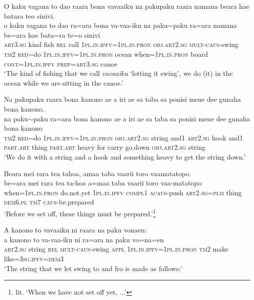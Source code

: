 \ea\label{ex:text26-1}
O kaku vagana to dao raara bona vavaaiku na pakupaku raara namana beara hae batara teo sinivi.\\
\gll o	kaku	vagana	to	dao	ra=ara	bona	va-vaa-iku	na	paku{$\sim$}paku	ra=ara	namana	be=ara	hae	bata=ra	te=o	sinivi\\
     \textsc{art}3.\textsc{sg}	kind	fish	\textsc{rel}	call	1\textsc{pl}.\textsc{in}.\textsc{ipfv}=1\textsc{pl}.\textsc{in}.\textsc{pron}	\textsc{obj}.\textsc{art}2.\textsc{sg}	\textsc{mult}-\textsc{caus}-swing	\textsc{tm}2	\textsc{red}{$\sim$}do	1\textsc{pl}.\textsc{in}.\textsc{ipfv}=1\textsc{pl}.\textsc{in}.\textsc{pron}	ocean	when=1\textsc{pl}.\textsc{in}.\textsc{pron}	board	\textsc{cont}=1\textsc{pl}.\textsc{in}.\textsc{ipfv}	\textsc{prep}=\textsc{art}3.\textsc{sg}	canoe\\
\glt `The kind of fishing that we call \textit{vavaaiku} `letting it swing', we do (it) in the ocean while we are sitting in the canoe.'
\z

\ea\label{ex:text26-2}
Na pakupaku raara bona kanono ae a iri ae sa taba sa ponisi mene dee gunaha bona kanono.\\
\gll na	paku{$\sim$}paku	ra=ara	bona	kanono	ae	a	iri	ae	sa	taba	sa	ponisi	mene	dee	gunaha	bona	kanono\\
     \textsc{tm}2	\textsc{red}{$\sim$}do	1\textsc{pl}.\textsc{in}.\textsc{ipfv}=1\textsc{pl}.\textsc{in}.\textsc{pron}	\textsc{obj}.\textsc{art}2.\textsc{sg}	string	and1	\textsc{art}2.\textsc{sg}	hook	and1	\textsc{part}.\textsc{art}	thing	\textsc{part}.\textsc{art}	heavy	for	carry	go.down	\textsc{obj}.\textsc{art}2.\textsc{sg}	string\\
\glt `We do it with a string and a hook and something heavy to get the string down.'
\z

\ea\label{ex:text26-3}
Beara mei rara tea tahoa, amaa taba vaarii toro vaamatatopo.\\
\gll be=ara	mei	rara	tea	ta-hoa	a=maa	taba	vaarii	toro	vaa-matatopo\\
     when=1\textsc{pl}.\textsc{in}.\textsc{pron}	do.not.yet	1\textsc{pl}.\textsc{in}.\textsc{ipfv}	\textsc{compl}1	\textsc{acaus}-push	\textsc{art}2.\textsc{sg}=\textsc{plm}	thing	\textsc{dem}6.\textsc{pl}	\textsc{tm}7	\textsc{caus}-be.prepared\\
\glt `Before we set off, these things must be prepared.'\footnote{lit. `When we have not set off yet, ...'}
\z

\ea\label{ex:text26-4}
A kanono to vavaaiku ni raara na paku vonaen:\\
\gll a	kanono	to	va-vaa-iku	ni	ra=ara	na	paku	vo=na=en\\
     \textsc{art}2.\textsc{sg}	string	\textsc{rel}	\textsc{mult}-\textsc{caus}-swing	\textsc{appl}	1\textsc{pl}.\textsc{in}.\textsc{ipfv}=1\textsc{pl}.\textsc{in}.\textsc{pron}	\textsc{tm}2	make	like=3\textsc{sg}.\textsc{ipfv}=\textsc{dem}3\\
\glt `The string that we let swing to and fro is made as follows:'
\z

